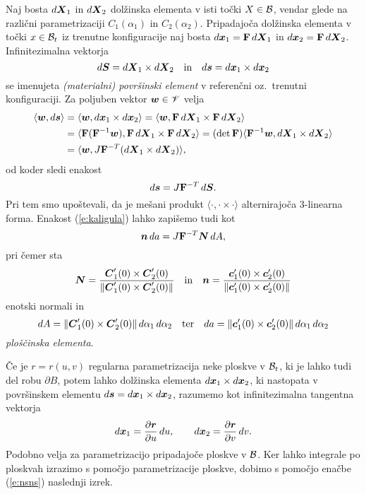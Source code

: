 Naj bosta $d\boldsymbol X_1$ in $d\boldsymbol X_2$ dolžinska elementa v isti točki $X\in\mathcal B$, vendar
glede na različni parametrizaciji $C_1(\alpha_1)$ in $C_2(\alpha_2)$. Pripadajoča dolžinska elementa
v točki $x\in\mathcal B_t$ iz trenutne konfiguracije naj bosta $d\boldsymbol x_1=\mathbf F\,d\boldsymbol X_1$
in $d\boldsymbol x_2=\mathbf F\,d\boldsymbol X_2$. Infinitezimalna vektorja
\[
	d\boldsymbol S=d\boldsymbol X_1\times d\boldsymbol X_2\quad\textrm{in}\quad d\boldsymbol s=d\boldsymbol x_1\times d\boldsymbol x_2
\]
se imenujeta \emph{(materialni) površinski element} v referenčni oz.~trenutni konfiguraciji.
Za poljuben vektor $\boldsymbol w\in\mathscr V$ velja
\begin{align*}
	\langle\boldsymbol w,d\boldsymbol s\rangle &=
	\langle\boldsymbol w,d\boldsymbol x_1\times d\boldsymbol x_2\rangle
	=\langle\boldsymbol w,\mathbf F\,d\boldsymbol X_1\times\mathbf F\,d\boldsymbol X_2\rangle \\
	&= \langle\mathbf F(\mathbf F^{-1}\boldsymbol w),\mathbf F\,d\boldsymbol X_1\times\mathbf F\,d\boldsymbol X_2\rangle
	=(\det\mathbf F)\langle\mathbf F^{-1}\boldsymbol w,d\boldsymbol X_1\times d\boldsymbol X_2\rangle \\
	&=\langle\boldsymbol w, J\mathbf F^{-T}(d\boldsymbol X_1\times d\boldsymbol X_2)\rangle,
\end{align*}
od koder sledi enakost
\begin{equation} \label{e:kaligula}
	d\boldsymbol s=J\mathbf F^{-T}\,d\boldsymbol S.
\end{equation}
Pri tem smo upoštevali, da je mešani produkt $\langle\cdot,\cdot\times\cdot\rangle$
alternirajoča 3-linearna forma. Enakost (\ref{e:kaligula}) lahko zapišemo tudi kot
\begin{equation} \label{e:nsns}
	\boldsymbol n\,da=J\mathbf F^{-T}\boldsymbol N\,dA,
\end{equation}
pri čemer sta
\[
	\boldsymbol N=\frac{\boldsymbol C_1'(0)\times\boldsymbol C_2'(0)}{\|\boldsymbol C_1'(0)\times\boldsymbol C_2'(0)\|}
	\quad\textrm{in}\quad
	\boldsymbol n=\frac{\boldsymbol c_1'(0)\times\boldsymbol c_2'(0)}{\|\boldsymbol c_1'(0)\times\boldsymbol c_2'(0)\|}
\]
enotski normali in
\[
	dA=\|\boldsymbol C_1'(0)\times\boldsymbol C_2'(0)\|\,d\alpha_1\,d\alpha_2\quad\textrm{ter}
	\quad da=\|\boldsymbol c_1'(0)\times\boldsymbol c_2'(0)\|\,d\alpha_1\,d\alpha_2
\]
\emph{ploščinska elementa}.

Če je $r=r(u,v)$ regularna parametrizacija neke ploskve v $\mathcal B_t$, ki je lahko tudi
del robu $\partial B$, potem lahko dolžinska elementa $d\boldsymbol x_1\times d\boldsymbol x_2$,
ki nastopata v površinskem elementu $d\boldsymbol s=d\boldsymbol x_1\times d\boldsymbol x_2$, razumemo kot
infinitezimalna tangentna vektorja
\[
	d\boldsymbol x_1=\frac{\partial \boldsymbol r}{\partial u}\,du,\qquad
	d\boldsymbol x_2=\frac{\partial \boldsymbol r}{\partial v}\,dv.
\]
Podobno velja za parametrizacijo pripadajoče ploskve v $\mathcal B$.
Ker lahko integrale po ploskvah izrazimo s pomočjo parametrizacije ploskve, dobimo
s pomočjo enačbe (\ref{e:nsns}) naslednji izrek.

